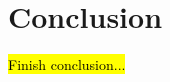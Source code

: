 \documentclass[11pt]{article}
\begin{document}





\section{Conclusion}

\hl{Finish conclusion...}




\end{document}
